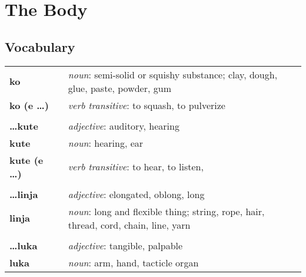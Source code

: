 
\section{The Body}
\subsection*{Vocabulary}
\begin{supertabular}{p{2,5cm}|ll}
    \textbf{ko}               &  & \textit{noun}: semi-solid or squishy substance; clay, dough, glue, paste, powder, gum       \\
    \textbf{ko (e \dots)}     &  & \textit{verb transitive}: to squash, to pulverize                                           \\
                              &  &                                                                                             \\
    \textbf{\dots kute}       &  & \textit{adjective}: auditory, hearing                                                       \\
    \textbf{kute}             &  & \textit{noun}: hearing, ear                                                                 \\
    \textbf{kute (e \dots)}   &  & \textit{verb transitive}: to hear, to listen,                                               \\
                              &  &                                                                                             \\
    \textbf{\dots linja}      &  & \textit{adjective}: elongated, oblong, long                                                 \\
    \textbf{linja}            &  & \textit{noun}: long and flexible thing; string, rope, hair, thread, cord, chain, line, yarn \\
                              &  &                                                                                             \\
    \textbf{\dots luka}       &  & \textit{adjective}: tangible, palpable                                                      \\
    \textbf{luka}             &  & \textit{noun}: arm, hand, tacticle organ                                                    \\

\end{supertabular}
